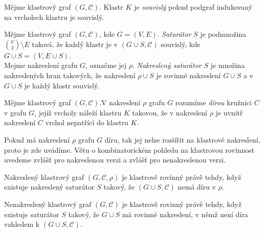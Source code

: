 \begin{defn}
Mějme klastrový graf $(G,\mathcal C)$. Klastr $K$ je \textit{souvislý} pokud podgraf indukovaný na vrcholech klastru je souvislý. 
\end{defn}

\begin{defn}
Mějme klastrový graf $(G,\mathcal C)$, kde $G=(V,E)$. \textit{Saturátor} $S$ je podmnožina ${V \choose 2} \setminus E$ taková, že každý klastr je v $(G \cup S,\mathcal C)$ souvislý, kde $G \cup S = (V,E \cup S)$. \\
Mejme nakreslení grafu $G$, označme jej $\rho$. \textit{Nakreslený saturátor} $S$ je množina nakreslených hran takových, že nakreslení $\rho \cup S$ je rovinné nakreslení $G \cup S$ a v $G \cup S$ je každý klastr souvislý. 
\end{defn}

\begin{defn}
Mějme klastrový graf $(G,\mathcal C)$.V nakreslení $\rho$ grafu $G$ rozumíme \textit{dírou} kružnici $C$ v grafu $G$, jejíž vrcholy náleží klastru $K$ takovou, že v nakreslení $\rho$  je uvnitř nakreslení $C$ vrchol nepatřící do klastru $K$.
\end{defn}

Pokud má nakreslení $\rho$ grafu $G$ díru, tak jej nelze rozšířit na klastrové nakreslení, proto je zde uvádíme.
Větu o kombinatorickém pohledu na klastrovou rovinnost uvedeme zvlášť pro nakreslenou verzi a zvlášť pro nenakreslenou verzi.

\begin{theorem}
Nakreslený klastrový graf $(G,\mathcal C, \rho)$ je klastrově rovinný právě tehdy, když existuje nakreslený saturátor $S$ takový, že $(G \cup S,\mathcal C)$ nemá díru v $\rho$.
\end{theorem}

\begin{theorem}
Nenakreslený klastrový graf $(G,\mathcal C)$ je klastrově rovinný právě tehdy, když existuje saturátor $S$ takový, že $G \cup S$ má rovinné nakreslení, v němž není díra vzhledem k $(G \cup S,\mathcal C)$.
\end{theorem}